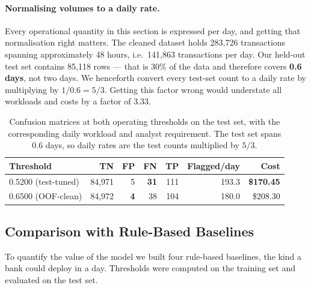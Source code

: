 \paragraph{Normalising volumes to a daily rate.} Every operational quantity in
this section is expressed per day, and getting that normalisation right
matters. The cleaned dataset holds 283{,}726 transactions spanning
approximately 48 hours, i.e.\ 141{,}863 transactions per day. Our held-out
test set contains 85{,}118 rows --- that is 30\% of the data and therefore
covers \textbf{0.6 days}, not two days. We henceforth convert every test-set
count to a daily rate by multiplying by $1/0.6 = 5/3$. Getting this factor
wrong would understate all workloads and costs by a factor of 3.33.

\begin{table}[h!]
\centering
\caption{Confusion matrices at both operating thresholds on the test set, with
the corresponding daily workload and analyst requirement. The test set spans
0.6 days, so daily rates are the test counts multiplied by $5/3$.}
\label{tab:cm}
\begin{tabular}{lrrrrrr}
\toprule
\textbf{Threshold} & \textbf{TN} & \textbf{FP} & \textbf{FN} & \textbf{TP} & \textbf{Flagged/day} & \textbf{Cost} \\
\midrule
0.5200 (test-tuned) & 84{,}971 & 5 & \textbf{31} & 111 & 193.3 & \textbf{\$170.45} \\
0.6500 (OOF-clean) & 84{,}972 & \textbf{4} & 38 & 104 & 180.0 & \$208.30 \\
\bottomrule
\end{tabular}
\end{table}

\subsection{Comparison with Rule-Based Baselines}

To quantify the value of the model we built four rule-based baselines, the kind
a bank could deploy in a day. Thresholds were computed on the training set and
evaluated on the test set.

